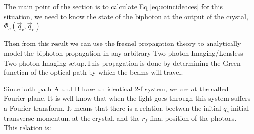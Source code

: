 The main point of the section is to calculate Eq \ref{eq:coincidences} 
for this situation, we need to know 
the state of the biphoton at the output of the crystal, $\tilde{\Phi}_c(\vec{q}_c,\vec{q}_c)$ 

Then from this result we can use the fresnel propagation theory to analytically model the biphoton 
propagation in any arbitrary Two-photon Imaging/Lensless Two-photon Imaging setup.This propagation is done 
by determining the Green function of the optical path by which the beams will travel\cite{green}.



 
Since both path A and B have an identical 2-f system, we are at the called Fourier plane. It is 
well know that when the light goes through this system suffers a Fourier transform\cite{introquantumoptics}. It means that 
there is a relation beetwen
the initial $q_c$ initial transverse momentum at the crystal, and the $r_f$ final position of 
the photons. This relation is:



